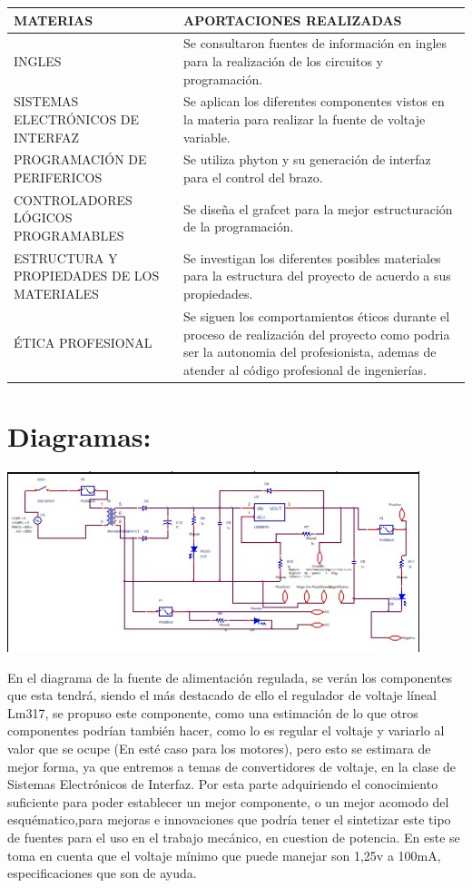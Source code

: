 \documentclass[14pt,a4paper]{article}
\begin{document}
\begin{tabular}{|p{70mm}|p{70mm}|} 

\hline
	MATERIAS & APORTACIONES REALIZADAS\\
\hline
	INGLES & Se consultaron fuentes de información en ingles para la realización de los circuitos y programación.\\
\hline
	SISTEMAS ELECTRÓNICOS DE INTERFAZ & Se aplican los diferentes componentes vistos en la materia para realizar la fuente de voltaje variable.\\
\hline
	PROGRAMACIÓN DE PERIFERICOS & Se utiliza phyton y su generación de interfaz para el control del brazo.\\
\hline
	CONTROLADORES LÓGICOS PROGRAMABLES & Se diseña el grafcet para la mejor estructuración de la programación.\\
\hline
	ESTRUCTURA Y PROPIEDADES DE LOS MATERIALES & Se investigan los diferentes posibles materiales para la estructura del proyecto de acuerdo a sus propiedades.  \\
\hline
	ÉTICA PROFESIONAL & Se siguen los comportamientos éticos durante el proceso de realización del proyecto como podria ser la autonomia del profesionista, ademas de atender al código profesional de ingenierías.  \\
\hline
\end{tabular}


\section{Diagramas:}

\begin{center}
\includegraphics[width=12cm]{Fuente.jpeg} 
\end{center}

En el diagrama de la fuente de alimentación regulada, se verán los componentes que esta tendrá, siendo el más destacado de ello el regulador de voltaje líneal Lm317, se propuso este componente, como una estimación de lo que otros componentes podrían también hacer, como lo es regular el voltaje y variarlo al valor que se ocupe (En esté caso para los motores), pero esto se estimara de mejor forma, ya que entremos a temas de convertidores de voltaje, en la clase de Sistemas Electrónicos de Interfaz. Por esta parte adquiriendo el conocimiento suficiente para poder establecer un mejor componente, o un mejor acomodo del esquématico,para mejoras e innovaciones que podría tener el sintetizar este tipo de fuentes para el uso en el trabajo mecánico, en cuestion de potencia. En este se toma en cuenta que el voltaje mínimo que puede manejar son 1,25v a 100mA, especificaciones que son de ayuda.\\
\end{document}
